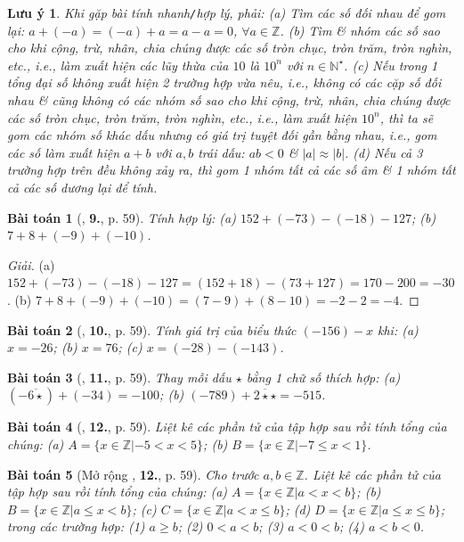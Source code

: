 \documentclass{article}
\numberwithin{equation}{section}
\newtheorem{baitoan}{Bài toán}
\newtheorem{luuy}{Lưu ý}[section]
\begin{document}
\begin{luuy}
	Khi gặp bài tính nhanh\emph{\texttt{/}}hợp lý, phải: (a) Tìm các số đối nhau để gom lại: $a + (-a) = (-a) + a = a - a = 0$, $\forall a\in\mathbb{Z}$. (b) Tìm \& nhóm các số sao cho khi cộng, trừ, nhân, chia chúng được các số tròn chục, tròn trăm, tròn nghìn, etc., i.e., làm xuất hiện các lũy thừa của $10$ là $10^n$ với $n\in\mathbb{N}^\star$. (c) Nếu trong 1 tổng đại số không xuất hiện 2 trường hợp vừa nêu, i.e., không có các cặp số đối nhau \& cũng không có các nhóm số sao cho khi cộng, trừ, nhân, chia chúng được các số tròn chục, tròn trăm, tròn nghìn, etc., i.e., làm xuất hiện $10^n$, thì ta sẽ gom các nhóm số khác dấu nhưng có giá trị tuyệt đối gần bằng nhau, i.e., gom các số làm xuất hiện $a + b$ với $a,b$ trái dấu: $ab < 0$ \& $|a|\approx|b|$. (d) Nếu cả 3 trường hợp trên đều không xảy ra, thì gom 1 nhóm tất cả các số âm \& 1 nhóm tất cả các số dương lại để tính.
\end{luuy}

\begin{baitoan}[\cite{Trong_Toan_6_2021}, \textbf{9.}, p. 59]
	Tính hợp lý: (a) $152 + (-73) - (-18) - 127$; (b) $7 + 8 + (-9) + (-10)$.
\end{baitoan}

\begin{proof}[Giải]
	(a) $152 + (-73) - (-18) - 127 = (152 + 18) - (73 + 127) = 170 - 200 = -30$. (b) $7 + 8 + (-9) + (-10) = (7 - 9) + (8 - 10) = -2 - 2 = -4$.
\end{proof}

\begin{baitoan}[\cite{Trong_Toan_6_2021}, \textbf{10.}, p. 59]
	Tính giá trị của biểu thức $(-156) - x$ khi: (a) $x = -26$; (b) $x = 76$; (c) $x = (-28) - (-143)$.
\end{baitoan}

\begin{baitoan}[\cite{Trong_Toan_6_2021}, \textbf{11.}, p. 59]
	Thay mỗi dấu $\star$ bằng 1 chữ số thích hợp: (a) $(-\overline{6\star}) + (-34) = -100$; (b) $(-789) + \overline{2\star\star} = -515$.
\end{baitoan}

\begin{baitoan}[\cite{Trong_Toan_6_2021}, \textbf{12.}, p. 59]
	Liệt kê các phần tử của tập hợp sau rồi tính tổng của chúng: (a) $A = \{x\in\mathbb{Z}|- 5 < x < 5\}$; (b) $B = \{x\in\mathbb{Z}|-7\le x < 1\}$.
\end{baitoan}

\begin{baitoan}[Mở rộng \cite{Trong_Toan_6_2021}, \textbf{12.}, p. 59]
	Cho trước $a,b\in\mathbb{Z}$. Liệt kê các phần tử của tập hợp sau rồi tính tổng của chúng: (a) $A = \{x\in\mathbb{Z}|a < x < b\}$; (b) $B = \{x\in\mathbb{Z}|a\le x < b\}$; (c) $C = \{x\in\mathbb{Z}|a < x\le b\}$; (d) $D = \{x\in\mathbb{Z}|a\le x\le b\}$; trong các trường hợp: (1) $a\ge b$; (2) $0 < a < b$; (3) $a < 0 < b$; (4) $a < b < 0$.
\end{baitoan}
\end{document}
